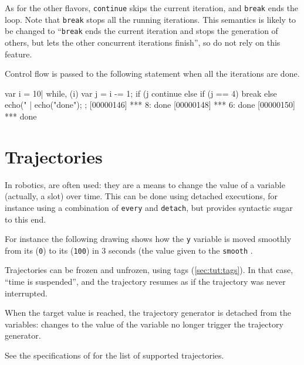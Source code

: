 As for the other flavors, \lstinline|continue| skips the current
iteration, and \lstinline|break| ends the loop.  Note that
\lstinline|break| stops all the running iterations.  This semantics is
likely to be changed to ``\lstinline|break| ends the current iteration
and stops the generation of others, but lets the other concurrent
iterations finish'', so do not rely on this feature.

Control flow is passed to the following statement when all the
iterations are done.

\begin{urbiscript}[firstnumber=last]
{
  var i = 10|
  while, (i)
  {
    var j = i -= 1;
    if (j %
      continue
    else if (j == 4)
      break
    else
      echo("%
  }|
  echo("done");
};
[00000146] *** 8: done
[00000148] *** 6: done
[00000150] *** done
\end{urbiscript}



\section{Trajectories}
\label{sec:lang:traj}

In robotics,  are often used: they are a
means to change the value of a variable (actually, a slot) over time.
This can be done using detached executions, for instance using a
combination of \lstinline|every| and \lstinline|detach|, but \us
provides syntactic sugar to this end.

For instance the following drawing shows how the \lstinline|y|
variable is moved smoothly from its 
(\lstinline|0|) to its  (\lstinline|100|) in 3
seconds (the value given to the \lstinline|smooth| .


Trajectories can be frozen and unfrozen, using tags
(\autoref{sec:tut:tags}).  In that case, ``time is suspended'', and
the trajectory resumes as if the trajectory was never interrupted.


When the target value is reached, the trajectory generator is detached
from the variables: changes to the value of the variable no longer
trigger the trajectory generator.


See the specifications of  for the list
of supported trajectories.




